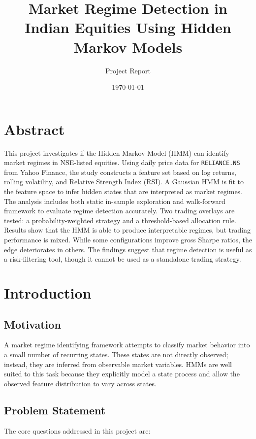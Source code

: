 \documentclass[11pt,a4paper]{article}
\title{Market Regime Detection in Indian Equities Using Hidden Markov Models}
\author{Project Report}
\date{\today}
\begin{document}
\maketitle

\section{Abstract}

This project investigates if the Hidden Markov Model (HMM) can identify market regimes in NSE-listed equities. Using daily price data for \texttt{RELIANCE.NS} from Yahoo Finance, the study constructs a feature set based on log returns, rolling volatility, and Relative Strength Index (RSI). A Gaussian HMM is fit to the feature space to infer hidden states that are interpreted as market regimes. The analysis includes both static in-sample exploration and walk-forward framework to evaluate regime detection accurately. Two trading overlays are tested: a probability-weighted strategy and a threshold-based allocation rule. Results show that the HMM is able to produce interpretable regimes, but trading performance is mixed. While some configurations improve gross Sharpe ratios, the edge deteriorates in others. The findings suggest that regime detection is useful as a risk-filtering tool, though it cannot be used as a standalone trading strategy.

\section{Introduction}

\subsection{Motivation}

A market regime identifying framework attempts to classify market behavior into a small number of recurring states. These states are not directly observed; instead, they are inferred from observable market variables. HMMs are well suited to this task because they explicitly model a state process and allow the observed feature distribution to vary across states.

\subsection{Problem Statement}

The core questions addressed in this project are:
\end{document}
